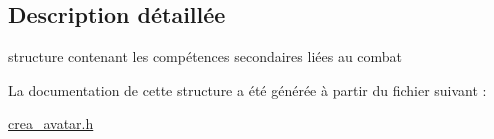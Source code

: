 \subsection{Description détaillée}
structure contenant les compétences secondaires liées au combat 

La documentation de cette structure a été générée à partir du fichier suivant \-:\begin{DoxyCompactItemize}
\item 
\hyperlink{crea__avatar_8h}{crea\-\_\-avatar.\-h}\end{DoxyCompactItemize}
